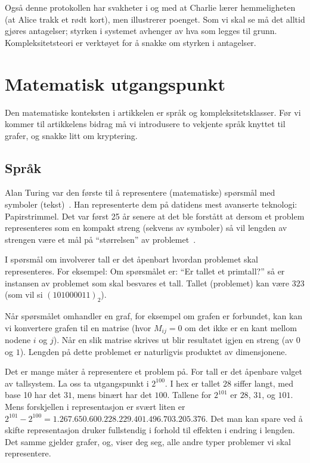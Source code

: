 \documentclass[a4paper, parskip=half]{scrartcl}
\theoremstyle{definition}
\begin{document}
Også denne protokollen har
svakheter i og med at Charlie lærer hemmeligheten (at Alice trakk et
rødt kort), men illustrerer poenget.
Som vi skal se må det alltid gjøres antagelser; styrken i systemet
avhenger av hva som legges til grunn.  Kompleksitetsteori er verktøyet
for å snakke om styrken i antagelser. 


%
%
\section{Matematisk utgangspunkt}
\label{sec:utgangspunkt}
Den matematiske konteksten i artikkelen er språk og
kompleksitetsklasser.  Før vi 
kommer til artikkelens bidrag må vi introdusere to vekjente språk
knyttet til grafer, og snakke litt om kryptering.

\subsection{Språk}
Alan Turing var den første til å representere (matematiske) spørsmål
med symboler (tekst)~\cite{Turing1937Computable}.  Han representerte
dem på datidens mest avanserte teknologi: Papirstrimmel.  Det var
først 25 år senere at det ble forstått at dersom et problem
representeres som en 
kompakt streng (sekvens av symboler) så vil lengden av strengen være
et mål på ``størrelsen'' av problemet~\cite{Hartmanis1965Complexity}.

I spørsmål om involverer tall er det åpenbart hvordan problemet skal
representeres. For eksempel: Om spørsmålet er: ``Er tallet et
primtall?'' så er instansen av problemet som skal besvares et tall.
Tallet (problemet) kan være $323$ (som vil si $(101000011)_2$).

Når spørsmålet omhandler en graf, for eksempel om grafen er forbundet,
kan kan vi konvertere grafen til en matrise (hvor $M_{ij}=0$ om det
ikke er en kant mellom nodene $i$ og $j$).  Når en slik matrise
skrives ut blir resultatet igjen en streng (av $0$ og $1$).  Lengden
på dette problemet er naturligvis produktet av dimensjonene.

Det er mange måter å representere et problem på.  For tall er det
åpenbare valget av tallsystem.  La oss ta utgangspunkt i $2^{100}$.  I
hex er tallet $28$ siffer langt, med base 10 har det $31$, mens binært har
det $100$.  Tallene for $2^{101}$ er $28$, $31$, og $101$.  Mens
forskjellen i representasjon er svært liten er $2^{101} - 2^{100} =
1.267.650.600.228.229.401.496.703.205.376$.  Det man kan spare ved å
skifte representasjon druker fullstendig i forhold til effekten i
endring i lengden.  Det samme gjelder grafer, og, viser deg seg, alle
andre typer problemer vi skal representere.
\end{document}
